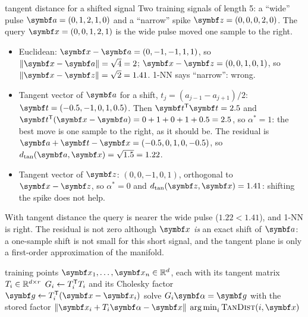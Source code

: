 \documentclass[11pt]{article}
\begin{document}
\begin{worked}{tangent distance for a shifted signal}
Two training signals of length 5: a ``wide'' pulse $\vect{a} = (0, 1, 2, 1, 0)$ and a ``narrow'' spike
$\vect{z} = (0, 0, 0, 2, 0)$. The query $\x = (0, 0, 1, 2, 1)$ is the wide pulse moved one sample to the right.
\begin{itemize}
\item Euclidean: $\x - \vect{a} = (0, -1, -1, 1, 1)$, so $\norm{\x - \vect{a}} = \sqrt{4} = 2$; $\x - \vect{z} =
(0, 0, 1, 0, 1)$, so $\norm{\x - \vect{z}} = \sqrt{2} = 1.41$. 1-NN says ``narrow'': wrong.
\item Tangent vector of $\vect{a}$ for a shift, $t_j = (a_{j-1} - a_{j+1})/2$: $\vect{t} = (-0.5, -1, 0, 1, 0.5)$.
Then $\vect{t}\T\vect{t} = 2.5$ and $\vect{t}\T(\x - \vect{a}) = 0 + 1 + 0 + 1 + 0.5 = 2.5$, so $\alpha^* = 1$: the
best move is one sample to the right, as it should be. The residual is $\vect{a} + \vect{t} - \x =
(-0.5, 0, 1, 0, -0.5)$, so $d_{\mathrm{tan}}(\vect{a}, \x) = \sqrt{1.5} = 1.22$.
\item Tangent vector of $\vect{z}$: $(0, 0, -1, 0, 1)$, orthogonal to $\x - \vect{z}$, so $\alpha^* = 0$ and
$d_{\mathrm{tan}}(\vect{z}, \x) = 1.41$: shifting the spike does not help.
\end{itemize}
With tangent distance the query is nearer the wide pulse ($1.22 < 1.41$), and 1-NN is right. The residual is not zero
although $\x$ \emph{is} an exact shift of $\vect{a}$: a one-sample shift is not small for this short signal, and the
tangent plane is only a first-order approximation of the manifold.
\end{worked}

\begin{algorithm}[htbp]
\caption{Nearest neighbour with one-sided tangent distance}
\label{alg:tangent}
\begin{algorithmic}[1]
\Require training points $\x_1, \dots, \x_n \in \R^d$, each with its tangent matrix $T_i \in \mathbb{R}^{d \times r}$
 
    \State $G_i \gets T_i^{\mathsf{T}} T_i$ and its Cholesky factor 
  \EndFor
\EndFunction
{}
  \State $\vect{g} \gets T_i\T(\x - \x_i)$ 
  \State solve $G_i \vect{\alpha} = \vect{g}$ with the stored factor 
  \State \Return $\norm{\x_i + T_i\vect{\alpha} - \x}$ 
\EndFunction
{}
  \State \Return $\argmin_i \Call{TanDist}{i, \x}$ 
\EndFunction
\end{algorithmic}
\end{algorithm}
\end{document}

